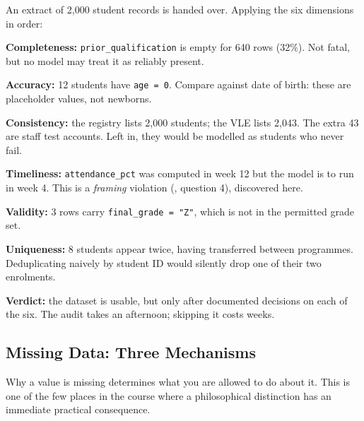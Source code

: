 \begin{worked}
An extract of 2{,}000 student records is handed over. Applying the six dimensions
in order:

\smallskip
\textbf{Completeness:} \texttt{prior\_qualification} is empty for 640 rows (32\%).
Not fatal, but no model may treat it as reliably present.

\textbf{Accuracy:} 12 students have \texttt{age = 0}. Compare against date of
birth: these are placeholder values, not newborns.

\textbf{Consistency:} the registry lists 2{,}000 students; the VLE lists 2{,}043.
The extra 43 are staff test accounts. Left in, they would be modelled as students
who never fail.

\textbf{Timeliness:} \texttt{attendance\_pct} was computed in week 12 but the
model is to run in week 4. This is a \emph{framing} violation (,
question 4), discovered here.

\textbf{Validity:} 3 rows carry \texttt{final\_grade = "Z"}, which is not in the
permitted grade set.

\textbf{Uniqueness:} 8 students appear twice, having transferred between
programmes. Deduplicating naively by student ID would silently drop one of their
two enrolments.

\smallskip
\textbf{Verdict:} the dataset is usable, but only after documented decisions on
each of the six. The audit takes an afternoon; skipping it costs weeks.
\end{worked}

\subsection{Missing Data: Three Mechanisms}

Why a value is missing determines what you are allowed to do about it. This is
one of the few places in the course where a philosophical distinction has an
immediate practical consequence.

